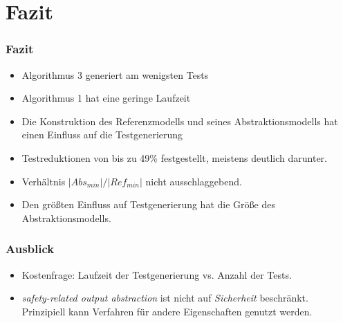 \section{Fazit}
\begin{frame}
\frametitle{Fazit}
    \begin{itemize}
        \item Algorithmus 3 generiert am wenigsten Tests
        \item Algorithmus 1 hat eine geringe Laufzeit
        \item Die Konstruktion des Referenzmodells und seines Abstraktionsmodells hat einen Einfluss auf die Testgenerierung
        \item Testreduktionen von bis zu 49\% festgestellt, meistens deutlich darunter.
        \item Verhältnis $|Abs_{min}|/|Ref_{min}|$ nicht ausschlaggebend.
        \item Den größten Einfluss auf Testgenerierung hat die Größe des Abstraktionsmodells.
    \end{itemize}
\end{frame}

\begin{frame}
    \frametitle{Ausblick}
        \begin{itemize}
            \item Kostenfrage: Laufzeit der Testgenerierung vs. Anzahl der Tests.
            \item \emph{safety-related output abstraction} ist nicht auf \emph{Sicherheit} beschränkt.\\
            Prinzipiell kann Verfahren für andere Eigenschaften genutzt werden.
        \end{itemize}
    \end{frame}